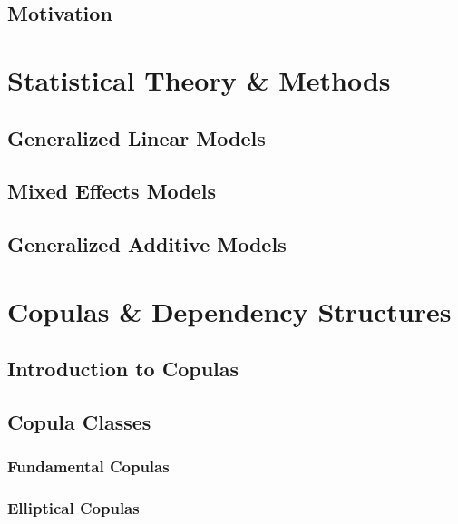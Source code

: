 \documentclass[12pt, twoside]{article}
\numberwithin{equation}{section}
\numberwithin{table}{section}
\numberwithin{figure}{section}
\begin{document}
\subsection{Motivation} \label{ssec:motivation}
%
\newpage
\thispagestyle{empty}
\cleardoublepage

\thispagestyle{plain}
\section{Statistical Theory \& Methods} \label{sec:theory_and_methods}

\subsection{Generalized Linear Models} \label{ssec:glm}

\subsection{Mixed Effects Models} \label{ssec:mixed_models}

\subsection{Generalized Additive Models} \label{ssec:gam}

\newpage
\thispagestyle{empty}
\cleardoublepage

\thispagestyle{plain}
\section{Copulas \& Dependency Structures} \label{sec:copulas_and_dependency_structures}

\subsection{Introduction to Copulas} \label{ssec:intro_to_copulas}

\subsection{Copula Classes} \label{ssec:copula_classes}

\subsubsection{Fundamental Copulas} \label{sssec:fundamental_copulas}

\subsubsection{Elliptical Copulas} \label{sssec:elliptical_copulas}

\end{document}
